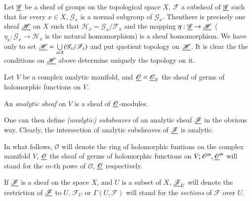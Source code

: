 \medskip
{}

Let $\underline{\mathscr{G}}$ be a sheaf of groups on the topological space $X$,
$\mathscr{F}$ a subsheaf of $\underline{\mathscr{G}}$ such that for every $x \in
X$, $\mathscr{G}_x$ is a normal subgroup of
$\mathscr{G}_x$. Then\pageoriginale there is precisely one sheaf
$\underline{\mathscr{H}}$ on $X$ such that $\mathscr{H}_x = \mathscr{G}_x /
\mathscr{F}_x$ and the mapping $\eta:\underline{ \mathscr{G}} \to \underline{\mathscr{H}} $
($\eta_x : \mathscr{G}_x \to \mathscr{H}_x$ is the natural
homomorphism) is a sheaf homomorphism. We have only to set
$\underline{\mathscr{H}} = \bigcup\limits_{x \in X} (\mathscr{G}_x /
\mathscr{F}_x)$ and put quotient topology on $\underline{\mathscr{H}}$. It is
clear the the conditions on $\underline{\mathscr{H}}$ above determine uniquely
the topology on it.

\medskip
{}

Let $V$ be a complex analytic manifold, and $\underline{\mathscr{O}}
=\underline{\mathscr{O}}_V$ the sheaf of germs of holomorphic functions on
$V$. 

\begin{defi*}
An \textit{analytic sheaf} on $V$ is a sheaf of $\underline{\mathscr{O}}$-modules.

One can then define \textit{(analytic) subsheaves} of an analytic
sheaf $\underline{\mathscr{F}}$ in the obvious way. Clearly, the intersection of
analytic subsheaves of $\underline{\mathscr{F}}$ is analytic.
\end{defi*}

\medskip
{}
In what follows, $\mathscr{O}$ will denote the ring of holomorphic
funtions on the complex manifold $V$, $\underline{\mathscr{O}}$ the sheaf of germs
of holomorphic functions on $V; \mathscr{O}^m, \underline{\mathscr{O}}^m$ will
stand for the $m$-th powe of $\mathscr{O}$, $\underline{\mathscr{O}}$
respectively. 

If $\underline{\mathscr{F}}$ is a sheaf on the space $X$, and $U$ is a subset
of $X$, $\underline{\mathscr{F}}_U$ will denote the restriction of
$\underline{\mathscr{F}}$ to $U$. $\mathscr{F}_U$ or $\Gamma(U,\mathscr{F})$
will stand for the \textit{sections} of $\mathscr{F}$ over $U$. 

